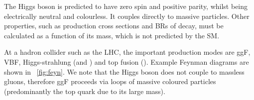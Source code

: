 
The Higgs boson is predicted to have zero spin and positive parity, whilst being 
electrically neutral and colourless. It couples directly to massive particles. Other 
properties, such as production cross sections and \acp{BR} of decay, must be calculated 
as a function of its mass, which is not predicted by the \ac{SM}.


At a hadron collider such as the \acs{LHC}, the important production modes are \ac{ggF},
\ac{VBF}, Higgs-strahlung (\WH and \ZH) and top fusion (\ttH). Example Feynman diagrams 
are shown in \Figure~\ref{fig:feyn}. We note that the Higgs boson does not couple to 
massless gluons, therefore \ac{ggF} proceeds via loops of massive coloured particles 
(predominantly the top quark due to its large mass). 

